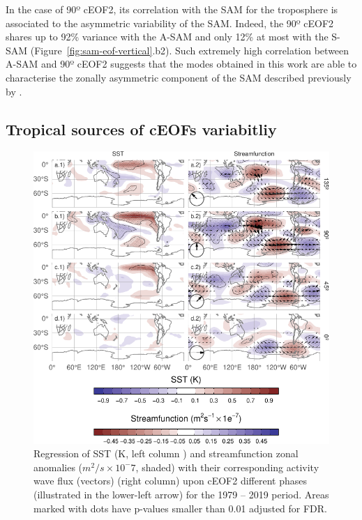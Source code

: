 \documentclass[pdflatex,sn-basic]{sn-jnl}
\theoremstyle{thmstyleone}%
\theoremstyle{thmstyletwo}%
\theoremstyle{thmstylethree}%
\begin{document}
In the case of 90º cEOF2, its correlation with the SAM for the troposphere is associated to the asymmetric variability of the SAM.
Indeed, the 90º cEOF2 shares up to 92\% variance with the A-SAM and only 12\% at most with the S-SAM (Figure~\ref{fig:sam-eof-vertical}.b2).
Such extremely high correlation between A-SAM and 90º cEOF2 suggests that the modes obtained in this work are able to characterise the zonally asymmetric component of the SAM described previously by \citet{campitelli2022}.

\hypertarget{tropical}{%
\subsection{Tropical sources of cEOFs variabitliy}\label{tropical}}

\begin{figure}
\includegraphics{../figures/sst-psi-2-1} \caption{Regression of SST (K, left column ) and streamfunction zonal anomalies (\(m^2/s\times10^-7\), shaded) with their corresponding activity wave flux (vectors) (right column) upon cEOF2 different phases (illustrated in the lower-left arrow) for the 1979 -- 2019 period. Areas marked with dots have p-values smaller than 0.01 adjusted for FDR.}\label{fig:sst-psi-2}
\end{figure}
\end{document}

